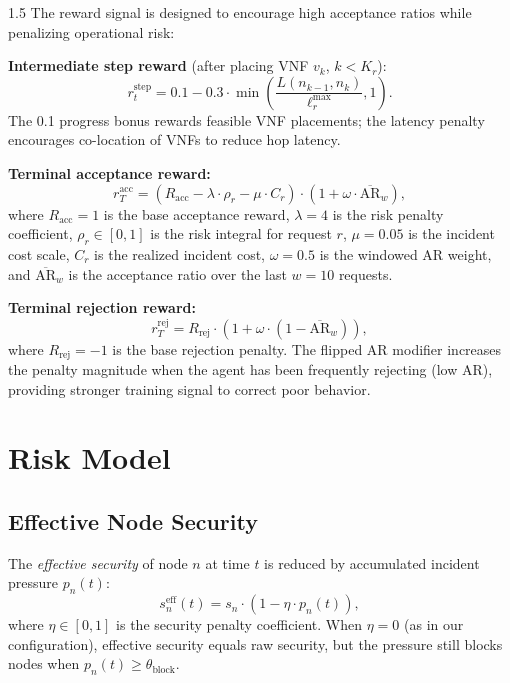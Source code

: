 \documentclass[A4paper,12pt]{report}
\theoremstyle{plain}
\theoremstyle{definition}
\theoremstyle{remark}
\numberwithin{equation}{section}
\begin{document}
\begin{spacing}{1.5}
The reward signal is designed to encourage high acceptance ratios while penalizing operational risk:

\textbf{Intermediate step reward} (after placing VNF $v_k$, $k < K_r$):
\begin{equation}
r_t^{\text{step}} = 0.1 - 0.3 \cdot \min\!\left(\frac{L(n_{k-1}, n_k)}{\ell_r^{\max}}, 1\right).
\end{equation}
The 0.1 progress bonus rewards feasible VNF placements; the latency penalty encourages co-location of VNFs to reduce hop latency.

\textbf{Terminal acceptance reward:}
\begin{equation}
r_T^{\text{acc}} = \left( R_{\text{acc}} - \lambda \cdot \rho_r - \mu \cdot C_r \right) \cdot \left(1 + \omega \cdot \overline{\text{AR}}_w\right),
\end{equation}
where $R_{\text{acc}} = 1$ is the base acceptance reward, $\lambda = 4$ is the risk penalty coefficient, $\rho_r \in [0,1]$ is the risk integral for request $r$, $\mu = 0.05$ is the incident cost scale, $C_r$ is the realized incident cost, $\omega = 0.5$ is the windowed AR weight, and $\overline{\text{AR}}_w$ is the acceptance ratio over the last $w = 10$ requests.

\textbf{Terminal rejection reward:}
\begin{equation}
r_T^{\text{rej}} = R_{\text{rej}} \cdot \left(1 + \omega \cdot (1 - \overline{\text{AR}}_w)\right),
\end{equation}
where $R_{\text{rej}} = -1$ is the base rejection penalty. The flipped AR modifier increases the penalty magnitude when the agent has been frequently rejecting (low AR), providing stronger training signal to correct poor behavior.

\section{Risk Model}

\subsection{Effective Node Security}

The \textit{effective security} of node $n$ at time $t$ is reduced by accumulated incident pressure $p_n(t)$:
\begin{equation}
s_n^{\text{eff}}(t) = s_n \cdot \left(1 - \eta \cdot p_n(t)\right),
\end{equation}
where $\eta \in [0,1]$ is the security penalty coefficient. When $\eta = 0$ (as in our configuration), effective security equals raw security, but the pressure still blocks nodes when $p_n(t) \geq \theta_{\text{block}}$.


\end{spacing}
\end{document}
